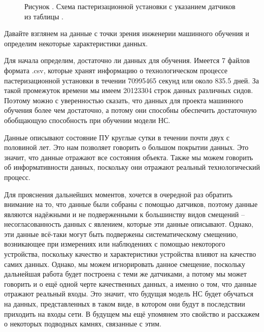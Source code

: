 {  \begin{figure}
    \centering
    \def\svgwidth{\textwidth}
    
    \caption*{\gostFont Рисунок \thechaptercntr .\theimagecntr \spc {--} Схема пастеризационной установки с указанием датчиков из таблицы \thechaptercntr .\thetablecntr }
    \label{fig:NNBlackBox}
  \end{figure} \addtocounter{imagecntr}{1} \addtocounter{tablecntr}{1}

  \par \redline Давайте взглянем на данные с точки зрения инженерии машинного обучения и определим некоторые характеристики данных. 

  \par \redline Для начала определим, достаточно ли данных для обучения. Имеется 7 файлов формата .csv, которые хранят информацию о технологическом процессе пастеризационной установки в течении 70995465 секунд или около 835.5 дней. За такой промежуток времени мы имеем 20123304 строк данных различных сидов. Поэтому можно с уверенностью сказать, что данных для проекта машинного обучения более чем достаточно, а потому они способны обеспечить достаточную обобщающую способность при обучении модели НС.

  \par \redline Данные описывают состояние ПУ круглые сутки в течении почти двух с половиной лет. Это нам позволяет говорить о большом покрытии данных. Это значит, что данные отражают все состояния объекта. Также мы можем говорить об информативности данных, поскольку они отражают реальный технологический процесс.

  \par \redline Для прояснения дальнейших моментов, хочется в очередной раз обратить внимание на то, что данные были собраны с помощью датчиков, поэтому данные являются надёжными и не подверженными к большинству видов смещений – несогласованность данных с явлением, которые эти данные описывают.  Однако, эти данные всё-таки могут быть подвержены систематическому смещению, возникающее при измерениях или наблюдениях с помощью некоторого устройства, поскольку качество и характеристики устройства влияют на качество самих данных. Однако, мы можем игнорировать данное смещение, поскольку дальнейшая работа будет построена с теми же датчиками, а потому мы может говорить и о ещё одной черте качественных данных, а именно о том, что данные отражают реальный входы. Это значит, что будущая модель НС будет обучаться на данных, представленных в таком виде, в котором они будут в последствии приходить на входы сети. В будущем мы ещё упомянем это свойство и расскажем о некоторых подводных камнях, связанные с этим.

}

